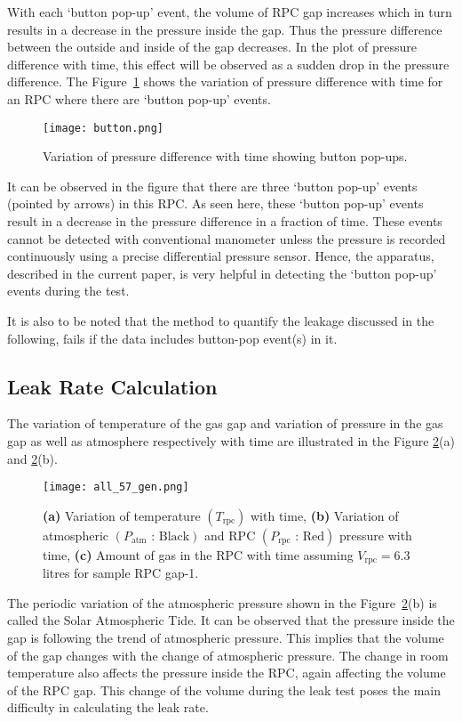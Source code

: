With each `button pop-up' event, the volume of RPC gap increases which in turn
results in a decrease in the pressure inside the gap. Thus the pressure
difference between the outside and inside of the gap decreases. In the plot of
pressure difference with time, this effect will be observed as a sudden drop
in the pressure difference. The Figure~\ref{fig:button} shows the variation of
pressure difference with time for an RPC where there are `button pop-up'
events. 
\begin{figure}
  \centering
  \texttt{[image: button.png]}
  \caption{Variation of pressure difference with time showing button pop-ups.}
  \label{fig:button}
\end{figure}
It can be observed in the figure that there are three `button pop-up' events
(pointed by arrows) in this RPC. As seen here, these `button pop-up' events
result in a decrease in the pressure difference in a fraction of time. These
events cannot be detected with conventional manometer unless the pressure is
recorded continuously using a precise differential pressure sensor. Hence, the
apparatus, described in the current paper, is very helpful in detecting the
`button pop-up' events during the test.

It is also to be noted that the method to quantify the leakage discussed in
the following, fails if the data includes button-pop event(s) in it.

\subsection{Leak Rate Calculation}\label{sec:calculation}
The variation of temperature of the gas gap and variation of pressure in the
gas gap as well as atmosphere respectively with time are illustrated in the
Figure \ref{fig:temp}(a) and \ref{fig:temp}(b). 
\begin{figure}[h]
  \centering
  \texttt{[image: all\_57\_gen.png]}
  \caption{\textbf{(a)} Variation of temperature $\left(T_{\textrm{rpc}}\right)$
    with time, \textbf{(b)} Variation of atmospheric
    $\left(P_{\textrm{atm}}\text{ : Black}\right)$ and RPC
    $\left(P_{\textrm{rpc}}\text{ : Red}\right)$ pressure with time, \textbf{(c)}
    Amount of gas in the RPC with time assuming $V_{\textrm{rpc}}=6.3$\,litres
    for sample RPC gap-1.}
  \label{fig:temp}
\end{figure}
The periodic variation of the atmospheric pressure shown in the
Figure~\ref{fig:temp}(b) is called the Solar Atmospheric Tide. It can be
observed that the pressure inside the gap is following the trend of atmospheric
pressure. This implies that the volume of the gap changes with the change of
atmospheric pressure. The change in room temperature also affects the pressure
inside the RPC, again affecting the volume of the RPC gap. This change of the
volume during the leak test poses the main difficulty in calculating the leak
rate.

